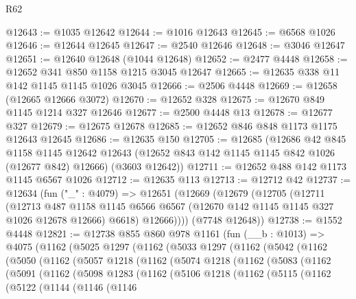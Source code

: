 \begin{lexlean}{R62}
\begin{coremodule}
@12643 := @1035 @12642
@12644 := @1016 @12643
@12645 := @6568 @1026
@12646 := @12644 @12645
@12647 := @2540 @12646
@12648 := @3046 @12647
@12651 := @12640 @12648 (@1044 @12648)
@12652 := @2477 @4448
@12658 := @12652 @341 @850 @1158 @1215 @3045 @12647
@12665 := @12635 @338 @11 @142 @1145 @1145 @1026 @3045
@12666 := @2506 @4448
@12669 := @12658 (@12665 @12666 @3072)
@12670 := @12652 @328
@12675 := @12670 @849 @1145 @1214 @327 @12646
@12677 := @2500 @4448 @13
@12678 := @12677 @327
@12679 := @12675 @12678
@12685 := @12652 @846 @848 @1173 @1175 @12643 @12645
@12686 := @12635 @150
@12705 := @12685
    (@12686
      @42
      @845
      @1158
      @1145
      @12642
      @12643
      (@12652 @843 @142 @1145 @1145 @842 @1026 (@12677 @842) @12666)
      (@3603 @12642))
@12711 := @12652 @488 @142 @1173 @1145 @6567 @1026
@12712 := @12635 @113
@12713 := @12712 @42
@12737 := @12634
    (fun ("_" : @4079) =>
    @12651
      (@12669
        (@12679
          (@12705
            (@12711
              (@12713
                @487
                @1158
                @1145
                @6566
                @6567
                (@12670 @142 @1145 @1145 @327 @1026 @12678 @12666)
                @6618)
              @12666))))
      (@7748 @12648))
@12738 := @1552 @4448
@12821 := @12738
    @855
    @860
    @978
    @1161
    (fun (__b : @1013) =>
    @4075
      (@1162
        (@5025
          @1297
          (@1162
            (@5033
              @1297
              (@1162
                (@5042
                  (@1162
                    (@5050
                      (@1162
                        (@5057
                          @1218
                          (@1162
                            (@5074
                              @1218
                              (@1162
                                (@5083
                                  (@1162
                                    (@5091
                                      (@1162
                                        (@5098
                                          @1283
                                          (@1162
                                            (@5106
                                              @1218
                                              (@1162
                                                (@5115
                                                  (@1162
                                                    (@5122
                                                      (@1144
                                                        (@1146
                                                          (@1146

\end{coremodule}
\end{lexlean}
